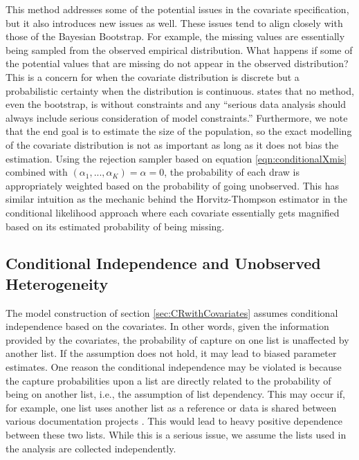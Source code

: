 \documentclass[
  12pt,
]{article}
\begin{document}
This method addresses some of the potential issues in the covariate
specification, but it also introduces new issues as well. These issues
tend to align closely with those of the Bayesian Bootstrap. For example,
the missing values are essentially being sampled from the observed
empirical distribution. What happens if some of the potential values
that are missing do not appear in the observed distribution? This is a
concern for when the covariate distribution is discrete but a
probabilistic certainty when the distribution is continuous.
\cite{rubin_bayesian_1981} states that no method, even the bootstrap, is
without constraints and any ``serious data analysis should always
include serious consideration of model constraints.'' Furthermore, we
note that the end goal is to estimate the size of the population, so the
exact modelling of the covariate distribution is not as important as
long as it does not bias the estimation. Using the rejection sampler
based on equation \ref{eqn:conditionalXmis} combined with
\((\alpha_1, ..., \alpha_K) = \alpha = 0\), the probability of each draw
is appropriately weighted based on the probability of going unobserved.
This has similar intuition as the mechanic behind the Horvitz-Thompson
estimator in the conditional likelihood approach where each covariate
essentially gets magnified based on its estimated probability of being
missing.

\subsection{Conditional Independence and Unobserved Heterogeneity}
\label{Sec:condindependence}

The model construction of section \ref{sec:CRwithCovariates} assumes
conditional independence based on the covariates. In other words, given
the information provided by the covariates, the probability of capture
on one list is unaffected by another list. If the assumption does not
hold, it may lead to biased parameter estimates. One reason the
conditional independence may be violated is because the capture
probabilities upon a list are directly related to the probability of
being on another list, i.e., the assumption of list dependency. This may
occur if, for example, one list uses another list as a reference or data
is shared between various documentation projects
\citep{manrique-vallier_capture-recapture_2020}. This would lead to
heavy positive dependence between these two lists. While this is a
serious issue, we assume the lists used in the analysis are collected
independently.
\end{document}
